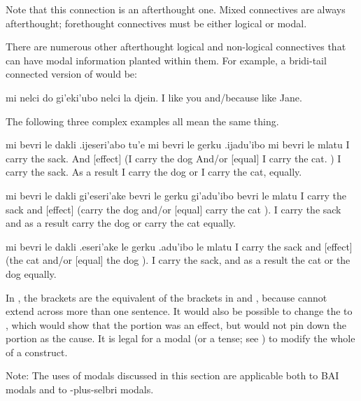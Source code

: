 Note that this connection is an afterthought one. Mixed
    connectives are always afterthought; forethought connectives
    must be either logical or modal. 

There are numerous other afterthought logical and
    non-logical connectives that can have modal information planted
    within them. For example, a bridi-tail connected version of  would be:
\begin{example}
mi nelci do gi'eki'ubo nelci la djein.\n
I like you and/because like Jane.
\end{example}

The following three complex examples all mean the same
    thing.
\begin{example}
mi bevri le dakli\n
\T	.ijeseri'abo tu'e mi bevri le gerku\n
\T	.ijadu'ibo mi bevri le mlatu \n
I carry the sack.\n
\T	And [effect] (I carry the dog\n
\T	And/or [equal] I carry the cat. )\n
I carry the sack.\n
\T	As a result I carry the dog\n
\T	or I carry the cat, equally.
\end{example}

\begin{example}
mi bevri le dakli\n
\T	gi'eseri'ake bevri le gerku\n
\T	gi'adu'ibo bevri le mlatu \n
I carry the sack\n
\T	and [effect] (carry the dog\n
\T	and/or [equal] carry the cat ).\n
I carry the sack\n
\T	and as a result carry the dog or carry the cat equally.
\end{example}

\begin{example}
mi bevri le dakli\n
\T	.eseri'ake le gerku\n
\T	.adu'ibo le mlatu \n
I carry the sack\n
\T	and [effect] (the cat\n
\T	and/or [equal] the dog ).\n
I carry the sack, and as a result the cat\n
\T	or the dog equally.
\end{example}

In , the 
    brackets are the equivalent of the  brackets in and , because  cannot extend across more
    than one sentence. It would also be possible to change the
     to , which would show that the
     portion was an effect, but would not pin down
    the  portion as the cause. It is legal for
    a modal (or a tense; see )
    to modify the whole of a  construct. 

Note: The uses of modals discussed in this section are
    applicable both to BAI modals and to -plus-selbri
    modals.



